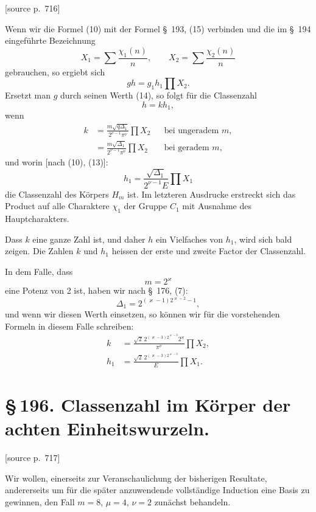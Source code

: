 \documentclass[11pt]{article}
\newcommand{\srcpage}[1]{\par\medskip\noindent\textsf{[source p.~#1]}\par\smallskip}
\begin{document}
\srcpage{716}
Wenn wir die Formel (10) mit der Formel \S~193, (15) verbinden und die im \S~194 eingeführte Bezeichnung
\[
X_1=\sum\frac{\chi_1(n)}{n},
\qquad
X_2=\sum\frac{\chi_2(n)}{n}
\]
gebrauchen, so ergiebt sich
\[
gh=g_1h_1\prod X_2.
\]
Ersetzt man $g$ durch seinen Werth (14), so folgt für die Classenzahl
\begin{equation}
h=kh_1,
\tag{15}
\end{equation}
wenn
\begin{equation}
\begin{aligned}
k&=\frac{m\sqrt{q\Delta_1}}{2^{\nu-1}\pi^\nu}\prod X_2 &&\text{bei ungeradem }m,\\
&=\frac{m\sqrt{\Delta_1}}{2^{\nu-1}\pi^\nu}\prod X_2 &&\text{bei geradem }m,
\end{aligned}
\tag{16}
\end{equation}
und worin [nach (10), (13)]:
\begin{equation}
h_1=\frac{\sqrt{\Delta_1}}{2^{\nu-1}E}\prod X_1
\tag{17}
\end{equation}
die Classenzahl des Körpers $H_m$ ist. Im letzteren Ausdrucke erstreckt sich das Product auf alle Charaktere $\chi_1$ der Gruppe $C_1$ mit Ausnahme des Hauptcharakters.

Dass $k$ eine ganze Zahl ist, und daher $h$ ein Vielfaches von $h_1$, wird sich bald zeigen. Die Zahlen $k$ und $h_1$ heissen der erste und zweite Factor der Classenzahl.

In dem Falle, dass
\[
m=2^\varkappa
\]
eine Potenz von 2 ist, haben wir nach \S~176, (7):
\[
\Delta_1=2^{(\varkappa-1)2^{\varkappa-2}-1},
\]
und wenn wir diesen Werth einsetzen, so können wir für die vorstehenden Formeln in diesem Falle schreiben:
\begin{equation}
\begin{aligned}
k&=\frac{\sqrt2\,2^{(\varkappa-3)2^{\varkappa-3}}2^\varkappa}{\pi^\nu}\prod X_2,\\
h_1&=\frac{\sqrt2\,2^{(\varkappa-3)2^{\varkappa-3}}}{E}\prod X_1.
\end{aligned}
\tag{18}
\end{equation}

\section*{\S\,196. Classenzahl im Körper der achten Einheitswurzeln.}

\srcpage{717}
Wir wollen, einerseits zur Veranschaulichung der bisherigen Resultate, andererseits um für die später anzuwendende vollständige Induction eine Basis zu gewinnen, den Fall $m=8$, $\mu=4$, $\nu=2$ zunächst behandeln.
\end{document}
